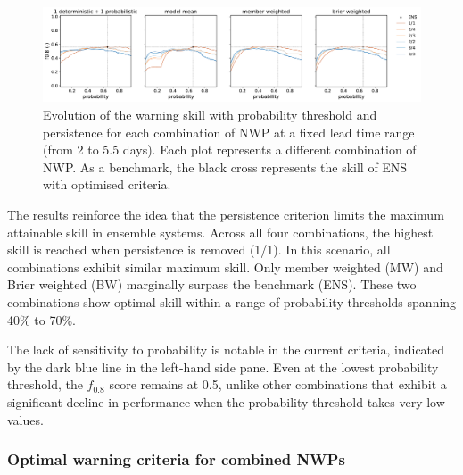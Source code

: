 \documentclass{ametsocV6.1}
\begin{document}
\begin{figure}
    \centering
    \includegraphics[width=1\textwidth]{figure06.pdf}
    \caption{Evolution of the warning skill with probability threshold and persistence  for each combination of NWP at a fixed lead time range (from 2 to 5.5 days). Each plot represents a different combination of NWP. As a benchmark, the black cross represents the skill of ENS with optimised criteria.}
    \label{fig:COMB_skill_probability}
\end{figure}

The results reinforce the idea that the persistence criterion limits the maximum attainable skill in ensemble systems. Across all four combinations, the highest skill is reached when persistence is removed (1/1). In this scenario, all combinations exhibit similar maximum skill. Only member weighted (MW) and Brier weighted  (BW) marginally surpass the benchmark (ENS). These two combinations show optimal skill within a range of probability thresholds spanning 40\% to 70\%.

The lack of sensitivity to probability is notable in the current criteria, indicated by the dark blue line in the left-hand side pane. Even at the lowest probability threshold, the $f_{0.8}$ score remains at 0.5, unlike other combinations that exhibit a significant decline in performance when the probability threshold takes very low values.

\subsubsection{Optimal warning criteria for combined NWPs}
\label{sec:COMB_optimal_criteria}
\end{document}
